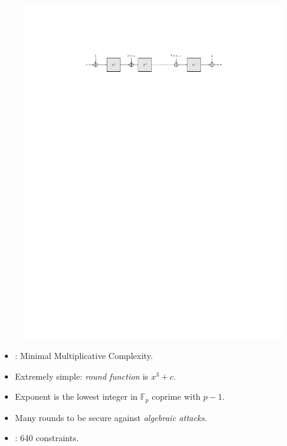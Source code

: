 \documentclass[beamer={10pt,xcolor=dvipsnames},target=mst]{thud}
\begin{document}
\begin{frame}{\Mimc{}~\cite{AlbrechtGRRT2016}}
  \begin{figure}
    \centering
    \includegraphics[scale=0.75]{res/AlbrechtGRRT2016.pdf}
  \end{figure}
  \begin{itemize}
    \item \Mimc{}: Minimal Multiplicative Complexity.
    \item Extremely simple: \emph{round function} is \(x^3 + c\).
    \item Exponent is the lowest integer in \(\mathbb{F}_p\) coprime with \(p - 1\).
    \item Many rounds to be secure against \emph{algebraic attacks}.
    \item {}: 640 constraints.
  \end{itemize}  
\end{frame}
\end{document}
